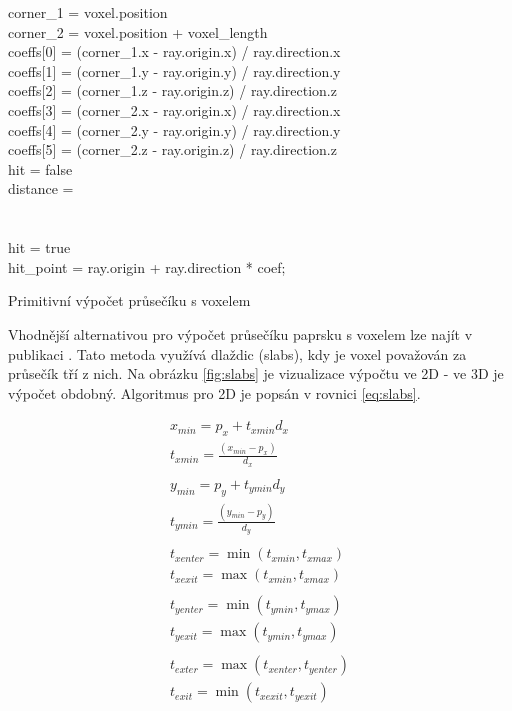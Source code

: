 \begin{center}
	\begin{czechalgorithm}[H] \label{alg:ray_box_primitive}
		corner_1 = voxel.position\\
		corner_2 = voxel.position + voxel\_length\\
		coeffs[0] = (corner_1.x - ray.origin.x) / ray.direction.x\\
		coeffs[1] = (corner_1.y - ray.origin.y) / ray.direction.y\\
		coeffs[2] = (corner_1.z - ray.origin.z) / ray.direction.z\\
		coeffs[3] = (corner_2.x - ray.origin.x) / ray.direction.x\\
		coeffs[4] = (corner_2.y - ray.origin.y) / ray.direction.y\\
		coeffs[5] = (corner_2.z - ray.origin.z) / ray.direction.z\\
		hit = false\\
		distance = \inf\\
		 {\\
			 {\\
				hit = true\\
				hit\_point = ray.origin + ray.direction * coef;\\
			}
		}
		\caption{Primitivní výpočet průsečíku s voxelem}
	\end{czechalgorithm}
\end{center}

Vhodnější alternativou pro výpočet průsečíku paprsku s voxelem lze najít v publikaci \cite{efficient_box_intersect}. Tato metoda využívá dlaždic (slabs), kdy je voxel považován za průsečík tří z nich. Na obrázku \ref{fig:slabs} je vizualizace výpočtu ve 2D - ve 3D je výpočet obdobný. Algoritmus pro 2D je popsán v rovnici \ref{eq:slabs}.


\begin{equation} \label{eq:slabs}
	\begin{gathered}
		x_{min} = p_x + t_{xmin} d_x\\
		t_{xmin} = \frac{(x_{min} - p_x)}{d_x}\\
		\\
		y_{min} = p_y + t_{ymin} d_y\\
		t_{ymin} = \frac{(y_{min} - p_y)}{d_y}\\
		\\
		t_{xenter} = \min(t_{xmin}, t_{xmax})\\
		t_{xexit} = \max(t_{xmin}, t_{xmax})\\
		\\
		t_{yenter} = \min(t_{ymin}, t_{ymax})\\
		t_{yexit} = \max(t_{ymin}, t_{ymax})\\
		\\
		t_{exter} = \max(t_{xenter}, t_{yenter})\\
		t_{exit} = \min(t_{xexit}, t_{yexit})\\
	\end{gathered}
\end{equation}

